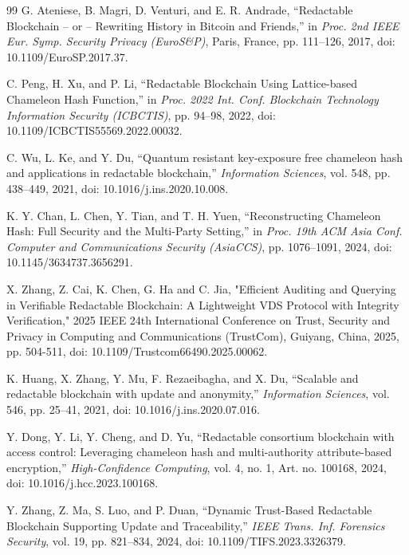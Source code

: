 \documentclass[lettersize,journal]{IEEEtran}
\begin{document}
\begin{thebibliography}{99}
    G. Ateniese, B. Magri, D. Venturi, and E. R. Andrade,
    ``Redactable Blockchain -- or -- Rewriting History in Bitcoin and Friends,''
    in \textit{Proc. 2nd IEEE Eur. Symp. Security Privacy (EuroS\&P)},
    Paris, France, pp. 111--126, 2017,
    doi: 10.1109/EuroSP.2017.37.
    
    C. Peng, H. Xu, and P. Li,
    ``Redactable Blockchain Using Lattice-based Chameleon Hash Function,''
    in \textit{Proc. 2022 Int. Conf. Blockchain Technology Information Security (ICBCTIS)},
    pp. 94--98, 2022,
    doi: 10.1109/ICBCTIS55569.2022.00032.
    
    C. Wu, L. Ke, and Y. Du,
    ``Quantum resistant key-exposure free chameleon hash and applications in redactable blockchain,''
    \textit{Information Sciences}, vol. 548, pp. 438--449, 2021,
    doi: 10.1016/j.ins.2020.10.008.
    
    K. Y. Chan, L. Chen, Y. Tian, and T. H. Yuen,
    ``Reconstructing Chameleon Hash: Full Security and the Multi-Party Setting,''
    in \textit{Proc. 19th ACM Asia Conf. Computer and Communications Security (AsiaCCS)},
    pp. 1076--1091, 2024,
    doi: 10.1145/3634737.3656291.
    
    X. Zhang, Z. Cai, K. Chen, G. Ha and C. Jia, "Efficient Auditing and Querying in Verifiable Redactable Blockchain: A Lightweight VDS Protocol with Integrity Verification," 2025 IEEE 24th International Conference on Trust, Security and Privacy in Computing and Communications (TrustCom), Guiyang, China, 2025, pp. 504-511, doi: 10.1109/Trustcom66490.2025.00062.
    
    K. Huang, X. Zhang, Y. Mu, F. Rezaeibagha, and X. Du,
    ``Scalable and redactable blockchain with update and anonymity,''
    \textit{Information Sciences}, vol. 546, pp. 25--41, 2021,
    doi: 10.1016/j.ins.2020.07.016.
    
    Y. Dong, Y. Li, Y. Cheng, and D. Yu,
    ``Redactable consortium blockchain with access control: Leveraging chameleon hash and multi-authority attribute-based encryption,''
    \textit{High-Confidence Computing}, vol. 4, no. 1, Art. no. 100168, 2024,
    doi: 10.1016/j.hcc.2023.100168.
    
    Y. Zhang, Z. Ma, S. Luo, and P. Duan,
    ``Dynamic Trust-Based Redactable Blockchain Supporting Update and Traceability,''
    \textit{IEEE Trans. Inf. Forensics Security}, vol. 19, pp. 821--834, 2024,
    doi: 10.1109/TIFS.2023.3326379.
    

\end{thebibliography}
\end{document}
